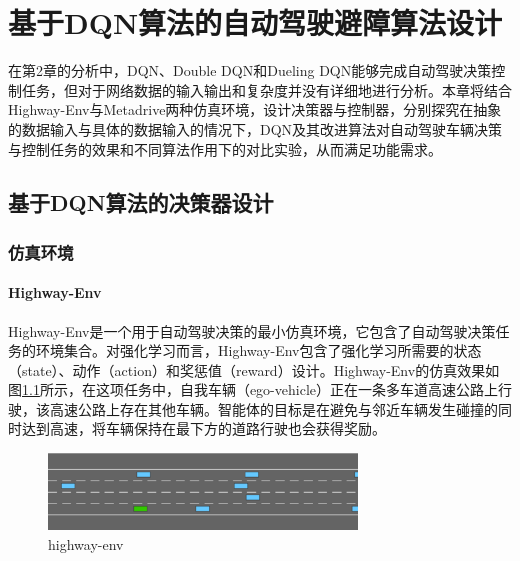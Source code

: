 %
%
%
%
%

\chapter{基于DQN算法的自动驾驶避障算法设计}

在第2章的分析中，DQN、Double DQN和Dueling DQN能够完成自动驾驶决策控制任务，但对于网络数据的输入输出和复杂度并没有详细地进行分析。本章将结合Highway-Env与Metadrive两种仿真环境，设计决策器与控制器，分别探究在抽象的数据输入与具体的数据输入的情况下，DQN及其改进算法对自动驾驶车辆决策与控制任务的效果和不同算法作用下的对比实验，从而满足功能需求。

\section{基于DQN算法的决策器设计}\label{3.1基于DQN算法的决策器设计} %

\subsection{仿真环境}\label{3.1.1仿真环境}

\subsubsection{Highway-Env}

Highway-Env是一个用于自动驾驶决策的最小仿真环境\cite{highway-env}，它包含了自动驾驶决策任务的环境集合。对强化学习而言，Highway-Env包含了强化学习所需要的状态（state）、动作（action）和奖惩值（reward）设计。Highway-Env的仿真效果如图\ref{highway-env}所示，在这项任务中，自我车辆（ego-vehicle）正在一条多车道高速公路上行驶，该高速公路上存在其他车辆。智能体的目标是在避免与邻近车辆发生碰撞的同时达到高速，将车辆保持在最下方的道路行驶也会获得奖励。

\begin{figure}[htbp]
    \vspace{13pt}
    \centering
    \includegraphics[width=0.73\textwidth]{images/chapter3/highway-env.png}
    \caption{highway-env}\label{highway-env} %
\end{figure}  

